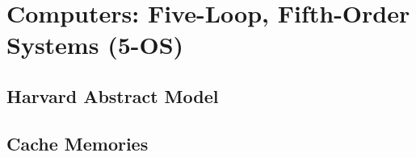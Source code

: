 \chapter{Computers: Five-Loop, Fifth-Order Systems (5-OS)}\label{lect6a}


\section{Harvard Abstract Model}

\section{Cache Memories}